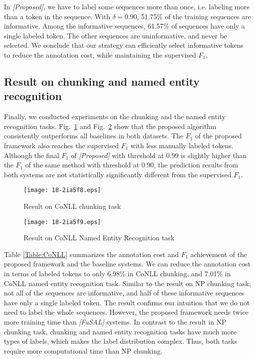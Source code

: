 \documentclass[english]{jnlp_JS2.0}
\begin{document}
In \textit{[Proposed]}, we have to label some sequences more than once, i.e. labeling more than a token in the sequence. With $\delta=0.90$, 51.75\% of the training sequences are informative. Among the informative sequences, 61.57\% of sequences have only a single labeled token. The other sequences are uninformative, and never be selected. We conclude that our strategy can efficiently select informative tokens to reduce the annotation cost, while maintaining the supervised $F_1$.


\subsection{Result on chunking and named entity recognition}

Finally, we conducted experiments on the chunking and the named entity recognition tasks. Fig.~\ref{Fig:CoNLL2000} and Fig.~\ref{Fig:CoNLL2003} show that the proposed algorithm consistently outperforms all baselines in both datasets. The $F_1$ of the proposed framework also reaches the supervised $F_1$ with less manually labeled tokens. Although the final $F_1$ of \textit{[Proposed]} with threshold at 0.99 is slightly higher than the $F_1$ of the same method with threshold at 0.90, the prediction results from both systems are not statistically significantly different from the supervised $F_1$.

\begin{figure}[b]
\begin{center}
\texttt{[image: 18-2ia5f8.eps]}
\end{center}
\caption{Result on CoNLL chunking task}
\label{Fig:CoNLL2000}
\end{figure}
\begin{figure}[b]
\begin{center}
\texttt{[image: 18-2ia5f9.eps]}
\end{center}
\caption{Result on CoNLL Named Entity Recognition task}
\label{Fig:CoNLL2003}
\end{figure}

Table \ref{Table:CoNLL} summarizes the annotation cost and $F_1$ achievement of the proposed framework and the baseline systems. We can reduce the annotation cost in terms of labeled tokens to only 6.98\% in CoNLL chunking, and 7.01\% in CoNLL named entity recognition task. Similar to the result on NP chunking task, not all of the sequences are informative, and half of these informative sequences have only a single labeled token. The result confirms our intuition that we do not need to label the whole sequences. However, the proposed framework needs twice more training time than \textit{[FuSAL]} systems. In contrast to the result in NP chunking task, chunking and named entity recognition tasks have much more types of labels, which makes the label distribution complex. Thus, both tasks require more computational time than NP chunking.
\end{document}
